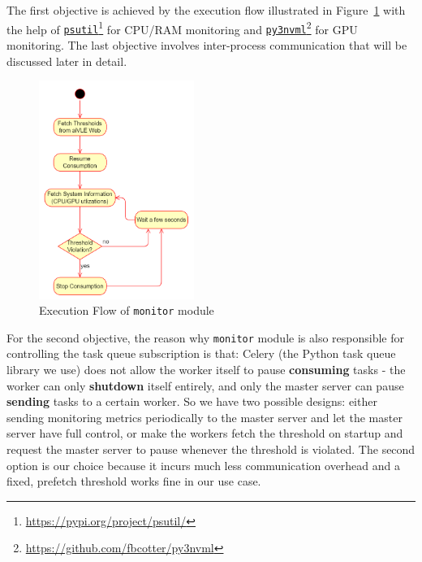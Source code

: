 The first objective is achieved by the execution flow illustrated in Figure~\ref{fig:aivle-worker-monitor-flow} with the help of \href{https://pypi.org/project/psutil/}{\texttt{psutil}}\footnote{\href{https://pypi.org/project/psutil/}{https://pypi.org/project/psutil/}} for CPU/RAM monitoring and \href{https://github.com/fbcotter/py3nvml}{\texttt{py3nvml}}\footnote{\href{https://github.com/fbcotter/py3nvml}{https://github.com/fbcotter/py3nvml}} for GPU monitoring. The last objective involves inter-process communication that will be discussed later in detail.

\begin{figure}[H]
    \centering
    \includegraphics[width=0.45\textwidth]{images/aivle-worker-monitor-flow.png}
    \caption{Execution Flow of \texttt{monitor} module}
    \label{fig:aivle-worker-monitor-flow}
\end{figure}

For the second objective, the reason why \texttt{monitor} module is also responsible for controlling the task queue subscription is that: Celery (the Python task queue library we use) does not allow the worker itself to pause \textbf{consuming} tasks - the worker can only \textbf{shutdown} itself entirely, and only the master server can pause \textbf{sending} tasks to a certain worker. So we have two possible designs: either sending monitoring metrics periodically to the master server and let the master server have full control, or make the workers fetch the threshold on startup and request the master server to pause whenever the threshold is violated. The second option is our choice because it incurs much less communication overhead and a fixed, prefetch threshold works fine in our use case.

